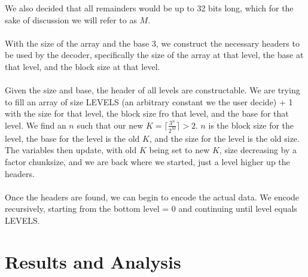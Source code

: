 \documentclass{article}
\begin{document}
We also decided that all remainders would be up to 32 bits long, which for the sake of discussion we will refer to as $M$.\\\\

With the size of the array and the base 3, we construct the necessary headers to be used by the decoder, specifically the size of the array at that level, the base at that level, and the block size at that level. \\\\

Given the size and base, the header of all levels are constructable. We are trying to fill an array of size LEVELS (an arbitrary constant we the user decide) + 1 with the size for that level, the block size fro that level, and the base for that level. We find an $n$ such that our new $K = \lceil \frac{3^n}{2^M} \rceil > 2$. $n$ is the block size for the level, the base for the level is the old $K$, and the size for the level is the old size. The variables then update, with old $K$ being set to new $K$, size decreasing by a factor chunksize, and we are back where we started, just a level higher up the headers.\\\\

Once the headers are found, we can begin to encode the actual data. We encode recursively, starting from the bottom level = 0 and continuing until level equals LEVELS. 


\bigskip

\noindent \section{Results and Analysis}
\end{document}

